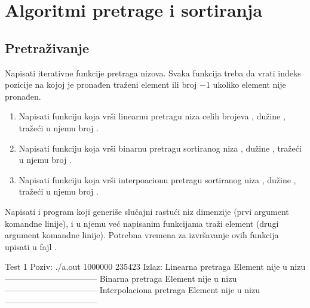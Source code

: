 
\chapter{Algoritmi pretrage i sortiranja}

\section{Pretraživanje}

\begin{Exercise}[label=401]
  Napisati iterativne funkcije pretraga nizova. Svaka funkcija treba
  da vrati indeks pozicije na kojoj je pronađen traženi element ili
  broj $-1$ ukoliko element nije pronađen.
  \begin{enumerate}  
  \item Napisati funkciju koja vrši linearnu pretragu niza 
    celih brojeva , dužine , tražeći u njemu broj
    .  
  \item Napisati funkciju koja vrši binarnu pretragu
    sortiranog niza , dužine , tražeći u njemu broj .
  \item Napisati funkciju koja vrši interpoacionu pretragu
    sortiranog niza , dužine , tražeći u njemu broj .
  \end{enumerate}
  Napisati i program koji generiše slučajni rastući niz dimenzije
   (prvi argument komandne linije), i u njemu već napisanim
  funkcijama traži element  (drugi argument komandne
  linije). Potrebna vremena za izvršavanje ovih funkcija upisati u
  fajl .
  
\begin{maxitest}
\begin{test}{Test 1}
Poziv: ./a.out 1000000 235423
Izlaz:
Linearna pretraga
Element nije u nizu
---------------------------------
Binarna pretraga
Element nije u nizu
---------------------------------
Interpolaciona pretraga
Element nije u nizu
---------------------------------
\end{test}
\end{maxitest}
  
\end{Exercise}

\begin{Answer}[ref=401]
\end{Answer}

